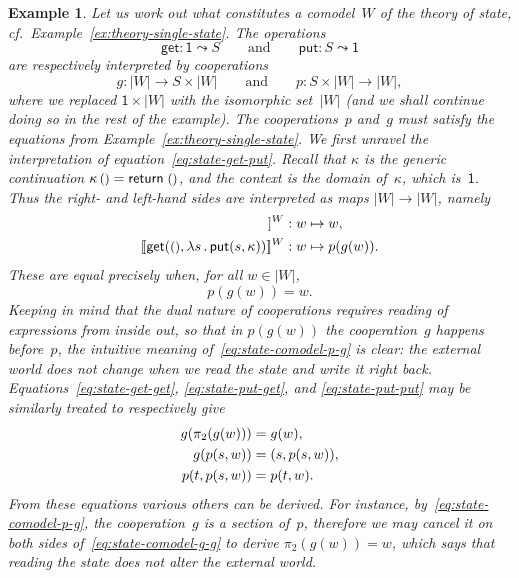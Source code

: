 \documentclass{amsart}
\newcommand{\carrier}[1]{|#1|} %
\newcommand{\lam}[1]{\lambda #1 \,.\,}
\newcommand{\leaf}[1]{\return{#1}} %
\newcommand{\opdecl}[3]{#1 : #2 \leadsto #3} %
\newcommand{\one}{\mathsf{1}} %
\newcommand{\unit}{{\text{\small$()$}}} %
\newcommand{\sem}[1]{[\![#1]\!]} %
\newcommand{\kode}[1]{\mathsf{#1}}
\newcommand{\opcall}[3]{\kode{#1}(#2, #3)}
\newcommand{\return}[1]{\kode{return}\;#1}
\newtheorem{example}{Example}[section]
\begin{document}
\begin{example}
  Let us work out what constitutes a comodel~$W$ of the theory of state, cf.\
  Example~\ref{ex:theory-single-state}. The operations
  \begin{equation*}
    \opdecl{\kode{get}}{\one}{S}
    \qquad\text{and}\qquad
    \opdecl{\kode{put}}{S}{\one}
  \end{equation*}
  are respectively interpreted by cooperations
  \begin{equation*}
    g : \carrier{W} \to S \times \carrier{W}
    \qquad\text{and}\qquad
    p : S \times \carrier{W} \to \carrier{W},
  \end{equation*}
  where we replaced $\one \times \carrier{W}$ with the isomorphic
  set~$\carrier{W}$ (and we shall continue doing so in the rest of the example).
  The cooperations~$p$ and~$g$ must satisfy the equations from
  Example~\ref{ex:theory-single-state}. We first unravel the interpretation of
  equation~\eqref{eq:state-get-put}. Recall that $\kappa$ is the generic
  continuation $\kappa \, \unit = \leaf{\unit}$, and the context is the domain
  of~$\kappa$, which is~$\one$. Thus the right- and left-hand sides are
  interpreted as maps $\carrier{W} \to \carrier{W}$, namely
  \begin{align*}
    \sem{\kappa\,\unit}^W &: w \mapsto w,\\
    \sem{\opcall{get}{\unit}{\lam{s} \opcall{put}{s}{\kappa}}}^W &: w \mapsto p(g(w)).
  \end{align*}
  These are equal precisely when, for all $w \in |W|$,
  \begin{equation}
    \label{eq:state-comodel-p-g}
    p(g(w)) = w.
  \end{equation}
  Keeping in mind that the dual nature of cooperations requires reading of
  expressions from inside out, so that in $p(g(w))$ the cooperation~$g$ happens
  before~$p$, the intuitive meaning of~\eqref{eq:state-comodel-p-g} is clear:
  the external world does not change when we read the state and write it right
  back. Equations~\eqref{eq:state-get-get}, \eqref{eq:state-put-get}, and
  \eqref{eq:state-put-put} may be similarly treated to respectively give
  \begin{align}
    \label{eq:state-comodel-g-g}
    g(\pi_2 (g (w))) &= g(w),
    \\
    \notag
    g(p(s, w)) &= (s, p (s, w)),
    \\
    \notag
    p(t, p(s, w)) &= p(t, w).
  \end{align}
  From these equations various others can be derived. For instance,
  by~\eqref{eq:state-comodel-p-g}, the cooperation~$g$ is a section of~$p$,
  therefore we may cancel it on both sides of~\eqref{eq:state-comodel-g-g} to
  derive $\pi_2(g(w)) = w$, which says that reading the state does not alter the
  external world.
\end{example}
\end{document}
